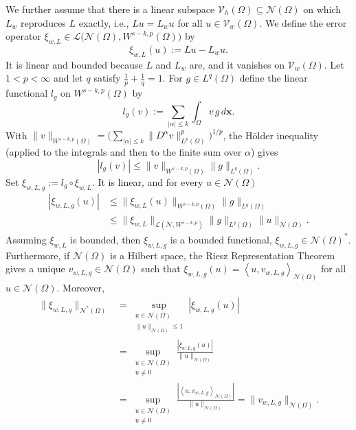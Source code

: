 \documentclass[11pt]{article}
\begin{document}
We further assume that there is a linear subspace $\mathcal{V}_h(\Omega) \subseteq \mathcal{N}(\Omega)$ on which $L_w$ reproduces $L$ exactly, i.e., $Lu = L_w u$ for all $u \in \mathcal{V}_w(\Omega)$. We define the error operator $\xi_{w,L} \in \mathcal{L}\bigl(\mathcal{N}(\Omega), W^{s-k,p}(\Omega)\bigr)$ by
\begin{equation*}
	\xi_{w,L}(u) := Lu - L_w u .
\end{equation*}
It is linear and bounded because $L$ and $L_w$ are, and it vanishes on $\mathcal{V}_w(\Omega)$. Let $1 < p < \infty$ and let $q$ satisfy $\frac{1}{p} + \frac{1}{q} = 1$. For $g \in L^{q}(\Omega)$ define the linear functional $l_g$ on $W^{s-k,p}(\Omega)$ by
\begin{equation*}
	l_g(v) := \sum_{|\alpha| \le k} \int_\Omega v \, g \, d\bm{x}.
\end{equation*}
With $\| v \|_{W^{s-k,p}(\Omega)} = \bigl( \sum_{|\alpha| \le k} \| D^\alpha v \|_{L^p(\Omega)}^p \bigr)^{1/p}$, the H\"{o}lder inequality (applied to the integrals and then to the finite sum over $\alpha$) gives
\begin{equation*}
	|l_g(v)| \le \| v \|_{W^{s-k,p}(\Omega)} \| g \|_{L^{q}(\Omega)}.
\end{equation*}
Set $\xi_{w,L,g} := l_g \circ \xi_{w,L}$. It is linear, and for every $u \in \mathcal{N}(\Omega)$
\begin{align*}
	|\xi_{w,L,g}(u)| &\le \| \xi_{w,L}(u) \|_{W^{s-k,p}(\Omega)} \| g \|_{L{^q}(\Omega)}\\
	&\le \| \xi_{w,L} \|_{\mathcal{L}(\mathcal{N}, W^{s-k,p})} \| g \|_{L^{q}(\Omega)} \| u \|_{\mathcal{N}(\Omega)}.
\end{align*}
Assuming $\xi_{w,L}$ is bounded, then $\xi_{w,L,g}$ is a bounded functional, $\xi_{w,L,g} \in \mathcal{N}(\Omega)^*$. Furthermore, if $\mathcal{N}(\Omega)$ is a Hilbert space, the Riesz Representation Theorem gives a unique $v_{w,L,g} \in \mathcal{N}(\Omega)$ such that $\xi_{w,L,g}(u) = \left\langle u, v_{w,L,g} \right\rangle_{\mathcal{N}(\Omega)}$ for all $u \in \mathcal{N}(\Omega)$. Moreover,
\begin{align*}
	\| \xi_{w,L,g} \|_{\mathcal{N}^*(\Omega)} &= \sup_{\substack{u \in \mathcal{N}(\Omega) \\ \| u \|_{\mathcal{N}(\Omega)} \le 1}} |\xi_{w,L,g}(u)| \\
	&= \sup_{\substack{u \in \mathcal{N}(\Omega) \\ u \ne 0}} \frac{|\xi_{w,L,g}(u)|}{\| u \|_{\mathcal{N}(\Omega)}} \\
	&= \sup_{\substack{u \in \mathcal{N}(\Omega) \\ u \ne 0}} \frac{|\left\langle u, v_{w,L,g} \right\rangle_{\mathcal{N}(\Omega)}|}{\| u \|_{\mathcal{N}(\Omega)}} = \| v_{w,L,g} \|_{\mathcal{N}(\Omega)}.
\end{align*}
\end{document}
